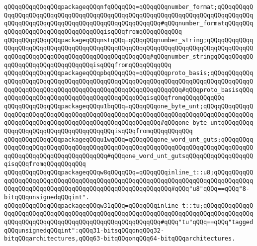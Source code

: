 \verb|qQQqqQQqqQQqqQQqpackageqQQqnfqQQqqQQq=qQQqqQQqnumber_format;qQQqqQQqqQQqqQQqqQQqqQQqqQQqqQQqqQQqqQQqqQQqqQQqqQQqqQQqqQQqqQQqqQQqqQQqqQQqqQQqqQQqqQQqqQQqqQQqqQQqqQQqqQQqqQQqqQQqqQQqqQQq#qQQqnumber_formatqQQqqQQqqQQqqQQqqQQqqQQqqQQqqQQqqQQqisqQQqfromqQQqqQQqqQQq|\newline
\verb|qQQqqQQqqQQqqQQqpackageqQQqnstqQQq=qQQqqQQqnumber_string;qQQqqQQqqQQqqQQqqQQqqQQqqQQqqQQqqQQqqQQqqQQqqQQqqQQqqQQqqQQqqQQqqQQqqQQqqQQqqQQqqQQqqQQqqQQqqQQqqQQqqQQqqQQqqQQqqQQqqQQqqQQq#qQQqnumber_stringqQQqqQQqqQQqqQQqqQQqqQQqqQQqqQQqqQQqisqQQqfromqQQqqQQqqQQq|\newline
\verb|qQQqqQQqqQQqqQQqpackageqQQqpbqQQqqQQq=qQQqqQQqproto_basis;qQQqqQQqqQQqqQQqqQQqqQQqqQQqqQQqqQQqqQQqqQQqqQQqqQQqqQQqqQQqqQQqqQQqqQQqqQQqqQQqqQQqqQQqqQQqqQQqqQQqqQQqqQQqqQQqqQQqqQQqqQQqqQQqqQQq#qQQqproto_basisqQQqqQQqqQQqqQQqqQQqqQQqqQQqqQQqqQQqqQQqqQQqisqQQqfromqQQqqQQqqQQq|\newline
\verb|qQQqqQQqqQQqqQQqpackageqQQqu1bqQQq=qQQqqQQqone_byte_unt;qQQqqQQqqQQqqQQqqQQqqQQqqQQqqQQqqQQqqQQqqQQqqQQqqQQqqQQqqQQqqQQqqQQqqQQqqQQqqQQqqQQqqQQqqQQqqQQqqQQqqQQqqQQqqQQqqQQqqQQqqQQqqQQq#qQQqone_byte_untqQQqqQQqqQQqqQQqqQQqqQQqqQQqqQQqqQQqqQQqisqQQqfromqQQqqQQqqQQq|\newline
\verb|qQQqqQQqqQQqqQQqpackageqQQqu1wqQQq=qQQqqQQqone_word_unt_guts;qQQqqQQqqQQqqQQqqQQqqQQqqQQqqQQqqQQqqQQqqQQqqQQqqQQqqQQqqQQqqQQqqQQqqQQqqQQqqQQqqQQqqQQqqQQqqQQqqQQqqQQqqQQq#qQQqone_word_unt_gutsqQQqqQQqqQQqqQQqqQQqisqQQqfromqQQqqQQqqQQq|\newline
\newline
\verb|qQQqqQQqqQQqqQQqpackageqQQqw8qQQqqQQq=qQQqqQQqinline_t::u8;qQQqqQQqqQQqqQQqqQQqqQQqqQQqqQQqqQQqqQQqqQQqqQQqqQQqqQQqqQQqqQQqqQQqqQQqqQQqqQQqqQQqqQQqqQQqqQQqqQQqqQQqqQQqqQQqqQQqqQQqqQQqqQQq#qQQq"u8"qQQq==qQQq"8-bitqQQqunsignedqQQqint".|\newline
\verb|qQQqqQQqqQQqqQQqpackageqQQqw31qQQq=qQQqqQQqinline_t::tu;qQQqqQQqqQQqqQQqqQQqqQQqqQQqqQQqqQQqqQQqqQQqqQQqqQQqqQQqqQQqqQQqqQQqqQQqqQQqqQQqqQQqqQQqqQQqqQQqqQQqqQQqqQQqqQQqqQQqqQQqqQQqqQQq#qQQq"tu"qQQq==qQQq"taggedqQQqunsignedqQQqint":qQQq31-bitsqQQqonqQQq32-bitqQQqarchitectures,qQQq63-bitqQQqonqQQq64-bitqQQqarchitectures.|\newline
